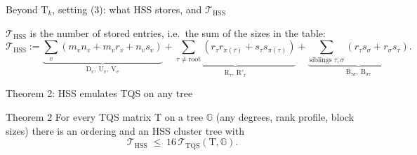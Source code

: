 \documentclass[aspectratio=169,11pt]{beamer}
\begin{document}
\begin{frame}{Beyond $\mathrm{T}_k$, setting (3): what HSS stores, and $\mathcal{T}_{\mathrm{HSS}}$}
\vspace{1mm}
\raggedright
\footnotesize
$\mathcal{T}_{\mathrm{HSS}}$ is the number of stored entries, i.e.\ the sum of the sizes in the table:
\[
\mathcal{T}_{\mathrm{HSS}}:=\underbrace{\textstyle\sum_{v}(m_vn_v+m_vr_v+n_vs_v)}_{\mathrm{D}_v,\ \mathrm{U}_v,\ \mathrm{V}_v}
+\underbrace{\textstyle\sum_{\tau\neq\text{root}}(r_\tau r_{\pi(\tau)}+s_\tau s_{\pi(\tau)})}_{\mathrm{R}_\tau,\ \mathrm{R}'_\tau}
+\underbrace{\textstyle\sum_{\text{siblings }\tau,\sigma}(r_\tau s_\sigma+r_\sigma s_\tau)}_{\mathrm{B}_{\tau\sigma},\ \mathrm{B}_{\sigma\tau}}.
\]
\end{frame}

\begin{frame}{Theorem 2: HSS emulates TQS on any tree}
\label{sl:thm2}\hypertarget{sl:thm2}{}
\footnotesize
\begin{block}{Theorem 2}
For every TQS matrix $\mathrm{T}$ on a tree $\mathbb{G}$ (any degrees, rank profile, block sizes) there is an ordering
and an HSS cluster tree with
\[
\mathcal{T}_{\mathrm{HSS}}\;\leq\;16\,\mathcal{T}_{\mathrm{TQS}}(\mathrm{T},\mathbb{G}).
\]
\end{block}

\end{frame}
\end{document}
